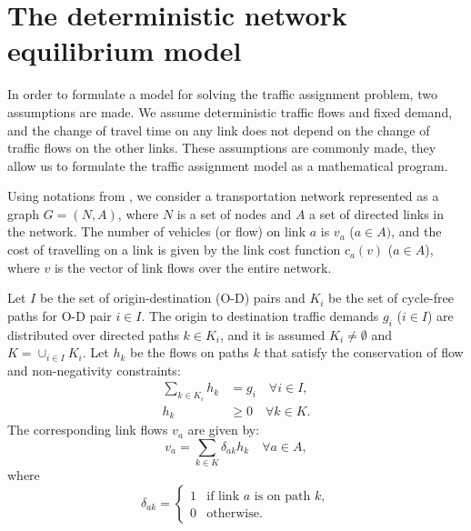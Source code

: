 \section{The deterministic network equilibrium model}
In order to formulate a model for solving the traffic assignment problem,
two assumptions are made.
We assume deterministic traffic flows and fixed demand,
and the change of travel time on any link does not depend on the change of traffic flows on the other links.
These assumptions are commonly made, they allow us to formulate the traffic assignment model as a mathematical program.

Using notations from \citet{Florian, Florian2008},
we consider a transportation network represented as a graph $G = (N, A)$,
where $N$ is a set of nodes and $A$ a set of directed links in the network.
The number of vehicles (or flow) on link $a$ is $v_a$ ($a \in A)$,
and the cost of travelling on a link is given by the link cost function $c_a(v)$ ($a \in A$),
where $v$ is the vector of link flows over the entire network.

Let $I$ be the set of origin-destination (O-D) pairs
and $K_i$ be the set of cycle-free paths for O-D pair $i \in I$.
The origin to destination traffic demands $g_i$ ($i \in I$) are distributed over directed paths $k \in K_i$,
and it is assumed $K_i \neq \emptyset$ and $K = \cup_{i \in I} K_i$.
Let $h_k$ be the flows on paths $k$ that satisfy the conservation of flow and non-negativity constraints:
\begin{align} \label{eq:ta1}
    \sum_{k \in K_i} h_k & = g_i \quad \forall i \in I, \\
    h_k &\geq 0 \quad \forall k \in K.
\end{align}
The corresponding link flows $v_a$ are given by:
\begin{equation}
    v_a = \sum_{k \in K} \delta_{ak} h_k \quad \forall a \in A,
\end{equation}
where
\begin{equation} \label{eq:ta4}
    \delta_{ak} = 
    \begin{cases}
        1 & \text{if link $a$ is on path $k$},\\
        0 & \text{otherwise}.
    \end{cases}
\end{equation}

